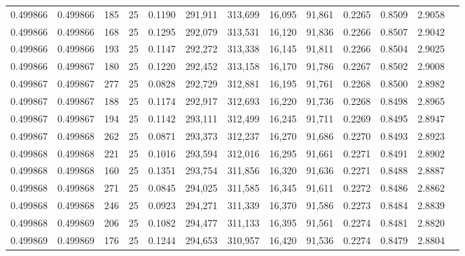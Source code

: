 \begin{tabular}{rrrrrrrrrrrrr}
0.499866 & 0.499866 &   185 &  25 &                                     0.1190 & 291,911 & 313,699 &  16,095 &  91,861 & 0.2265 & 0.8509 & 2.9058 \\
0.499866 & 0.499866 &   168 &  25 &                                     0.1295 & 292,079 & 313,531 &  16,120 &  91,836 & 0.2266 & 0.8507 & 2.9042 \\
0.499866 & 0.499866 &   193 &  25 &                                     0.1147 & 292,272 & 313,338 &  16,145 &  91,811 & 0.2266 & 0.8504 & 2.9025 \\
0.499866 & 0.499867 &   180 &  25 &                                     0.1220 & 292,452 & 313,158 &  16,170 &  91,786 & 0.2267 & 0.8502 & 2.9008 \\
0.499867 & 0.499867 &   277 &  25 &                                     0.0828 & 292,729 & 312,881 &  16,195 &  91,761 & 0.2268 & 0.8500 & 2.8982 \\
0.499867 & 0.499867 &   188 &  25 &                                     0.1174 & 292,917 & 312,693 &  16,220 &  91,736 & 0.2268 & 0.8498 & 2.8965 \\
0.499867 & 0.499867 &   194 &  25 &                                     0.1142 & 293,111 & 312,499 &  16,245 &  91,711 & 0.2269 & 0.8495 & 2.8947 \\
0.499867 & 0.499868 &   262 &  25 &                                     0.0871 & 293,373 & 312,237 &  16,270 &  91,686 & 0.2270 & 0.8493 & 2.8923 \\
0.499868 & 0.499868 &   221 &  25 &                                     0.1016 & 293,594 & 312,016 &  16,295 &  91,661 & 0.2271 & 0.8491 & 2.8902 \\
0.499868 & 0.499868 &   160 &  25 &                                     0.1351 & 293,754 & 311,856 &  16,320 &  91,636 & 0.2271 & 0.8488 & 2.8887 \\
0.499868 & 0.499868 &   271 &  25 &                                     0.0845 & 294,025 & 311,585 &  16,345 &  91,611 & 0.2272 & 0.8486 & 2.8862 \\
0.499868 & 0.499868 &   246 &  25 &                                     0.0923 & 294,271 & 311,339 &  16,370 &  91,586 & 0.2273 & 0.8484 & 2.8839 \\
0.499868 & 0.499869 &   206 &  25 &                                     0.1082 & 294,477 & 311,133 &  16,395 &  91,561 & 0.2274 & 0.8481 & 2.8820 \\
0.499869 & 0.499869 &   176 &  25 &                                     0.1244 & 294,653 & 310,957 &  16,420 &  91,536 & 0.2274 & 0.8479 & 2.8804 \\

\end{tabular}
